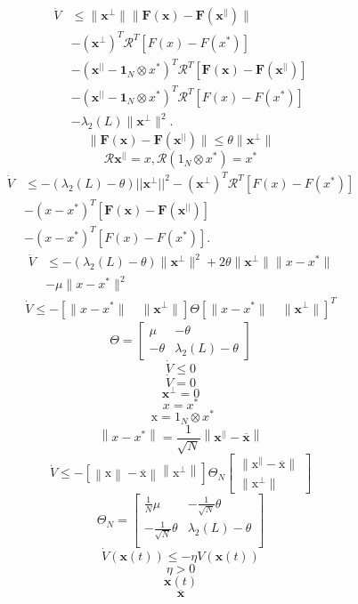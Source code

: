 \documentclass[11pt]{ctexart}
\begin{document}
$$\begin{aligned}
	\dot{V}& \leq\|\mathbf{x}^\perp\|\|\mathbf{F}(\mathbf{x})-\mathbf{F}(\mathbf{x}^{||})\|  \\
	&-(\mathbf{x}^\perp)^T\mathcal{R}^T[F(x)-F(x^*)] \\
	&-(\mathbf{x}^{||}-\mathbf{1}_N\otimes x^*)^T\mathcal{R}^T\left[\mathbf{F}(\mathbf{x})-\mathbf{F}(\mathbf{x}^{||})\right] \\
	&-(\mathbf{x}^{||}-\mathbf{1}_N\otimes x^*)^T\mathcal{R}^T[F(x)-F(x^*)] \\
	&-\left.\lambda_2(L)\|\mathbf{x}^\perp\|^2.\right.
\end{aligned}$$
$$\|\mathbf{F}(\mathbf{x})-\mathbf{F}(\mathbf{x}^{||})\|\leq\theta\|\mathbf{x}^{\perp}\|$$
$$\mathcal{R}\mathbf{x}^{||}=x,\mathcal{R}(1_{N}\otimes x^{*})=x^{*}$$
$$\begin{aligned}
	\dot{V}& \leq-(\lambda_2(L)-\theta)||\mathbf{x}^{\perp}||^2-(\mathbf{x}^{\perp})^T\mathcal{R}^T[F(x)-F(x^{*})]  \\
	&-\left(x-x^*\right)^T[\mathbf{F}(\mathbf{x})-\mathbf{F}(\mathbf{x}^{||})] \\
	&-(x-x^*)^T[F(x)-F(x^*)].
\end{aligned}$$
$$\begin{aligned}\dot{V}&\leq-(\lambda_2(L)-\theta)\|\mathbf{x}^\perp\|^2+2\theta\|\mathbf{x}^\perp\|\|x-x^*\|\\&-\mu\|x-x^*\|^2\end{aligned}$$
$$\begin{aligned}\dot{V}\le-[\|x-x^*\|\quad\|\mathbf{x}^\perp\|]\Theta[\|x-x^*\|\quad\|\mathbf{x}^\perp\|]^T\end{aligned}$$
$$\left.\Theta=\left[\begin{array}{cc}{\mu}&{-\theta}\\{-\theta}&{\lambda_{2}\left(L\right)-\theta}\end{array}\right.\right]$$
$$\dot{V}\leq0$$
$$\dot{V}=0$$
$$\mathbf{x}^{\perp}=0$$
$$x=x^{*}$$
$$\text{  x}=1_{N}\otimes x^{*}$$
$$\left\|x-x^*\right\|=\frac1{\sqrt{N}}\left.\left\|\mathbf{x}^{\left|\right|}-\overline{\mathbf{x}}\right\|\right. $$
$$\left.\dot{V}\leq-\left[\left\|\mathrm{x}\right\|-\overline{\mathrm{x}}\right\|\left\|\mathrm{x}^{\perp}\right\|\right]\Theta_N\left[\begin{smallmatrix}\|\mathrm{x}^{\parallel}-\overline{\mathrm{x}}\|\\\|\mathrm{x}^{\perp}\|\end{smallmatrix}\right]$$
$$\Theta_{N}=[\begin{matrix}{{\frac{1}{N}\mu}}&{{-\frac{1}{\sqrt{N}}\theta}}\\{{-\frac{1}{\sqrt{N}}\theta}}&{{\lambda_{2}\left(L\right)-\theta}}\\\end{matrix}]$$
$$\dot{V}(\mathbf{x}(t))\leq-\eta V(\mathbf{x}(t))$$
$$\eta>0$$
$$\mathbf{x}(t)$$
$$\overline{\mathbf{x}}$$
\end{document}

